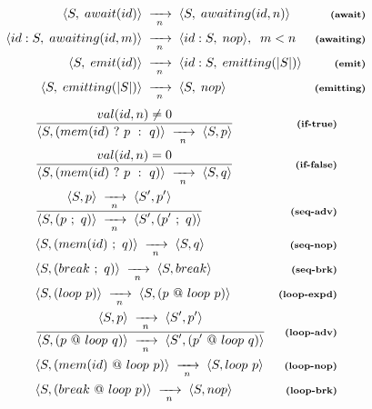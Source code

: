 \documentclass{acm_proc_article-sp}
\newcommand{\ST}{\1\xrightarrow[~n~]{}\1}
\newcommand{\LL}{\langle}
\newcommand{\RR}{\rangle}
\newcommand{\DS}{\displaystyle}
\newcommand{\rr}[1] {{\textbf{\scriptsize{#1}}}}
\newcommand{\1}{\;}
\newcommand{\2}{\;\;}
\newcommand{\3}{\;\;\;}
\newcommand{\5}{\;\;\;\;\;}
\begin{document}
\begin{figure}
%
{ \setlength{\jot}{7pt}
\begin{align*}
\LL S,\1await(id) \RR &\ST
\LL S,\1awaiting(id,n) \RR
    & \rr{(await)}      \\
\LL id:S,\1awaiting(id,m) \RR &\ST
\LL id:S,\1nop \RR, \2m<n
    & \rr{(awaiting)}   \\
\LL S,\1emit(id) \RR &\ST
\LL id:S,\1emitting(|S|) \RR
    & \rr{(emit)}       \\
\LL S,\1emitting(|S|) \RR &\ST
\LL S,\1nop \RR
    & \rr{(emitting)}
\end{align*}
}
%
{ %
\begin{eqnarray*}
& \frac
    { \DS val(id,n) \neq 0 }
    { \DS \LL S, (mem(id)~?~p~:~q) \RR \ST
          \LL S, p \RR }
    & \rr{(if-true)}       \\
& \frac
    { \DS val(id,n) = 0 }
    { \DS \LL S, (mem(id)~?~p~:~q) \RR \ST
          \LL S, q \RR }
    & \rr{(if-false)}       \\
& \frac
    {\DS \LL S,p \RR \ST \LL S',p' \RR }
    {\DS \LL S, (p~;~q) \RR \ST \LL S', (p'~;~q) \RR }
    & \rr{(seq-adv)}        \\
& \LL S, (mem(id)~;~q) \RR \ST  \LL S, q \RR
    & \rr{(seq-nop)}        \\
& \LL S, (break~;~q) \RR \ST \LL S, break \RR
    & \rr{(seq-brk)}        \\
%
& \LL S, (loop~p) \RR \ST \LL S, (p~@~loop~p) \RR
    & \rr{(loop-expd)}       \\
& \frac
    {\DS \LL S,p \RR \ST \LL S',p' \RR }
    {\DS \LL S, (p~@~loop~q) \RR \ST \LL S', (p'~@~loop~q) \RR }
    & \rr{(loop-adv)}    \\
& \LL S, (mem(id)~@~loop~p) \RR \ST \LL S, loop~p \RR
    & \rr{(loop-nop)}    \\
& \LL S, (break~@~loop~p) \RR \ST \LL S, nop \RR
    & \rr{(loop-brk)}       \\
%

\end{eqnarray*}}
\end{figure}
\end{document}

